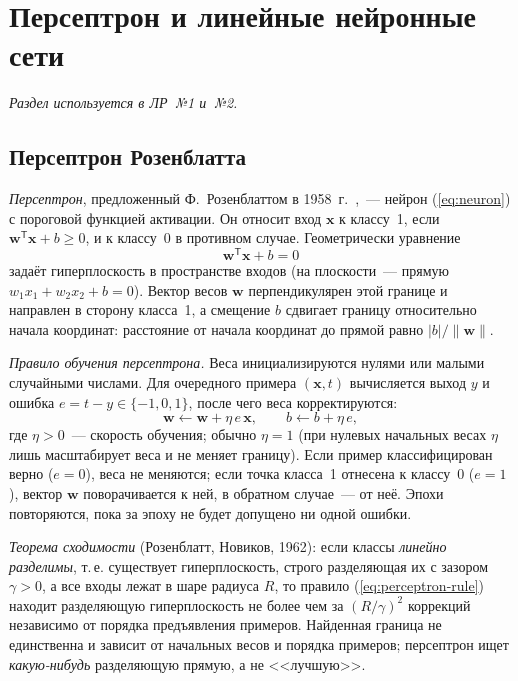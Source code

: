 \section{Персептрон и линейные нейронные сети}
\label{sec:perceptron}

\noindent\hspace{1.25cm}\emph{Раздел используется в ЛР~№1 и~№2.}

\subsection{Персептрон Розенблатта}

\emph{Персептрон}, предложенный Ф.~Розенблаттом в 1958~г.~\cite{rosenblatt1958},~--- нейрон
(\ref{eq:neuron}) с пороговой функцией активации. Он относит вход $\mathbf{x}$ к классу~1,
если $\mathbf{w}^{\mathsf T}\mathbf{x} + b \ge 0$, и к классу~0 в противном случае. Геометрически
уравнение
\begin{equation}
\label{eq:hyperplane}
\mathbf{w}^{\mathsf T}\mathbf{x} + b = 0
\end{equation}
задаёт гиперплоскость в пространстве входов (на плоскости~--- прямую $w_1x_1 + w_2x_2 + b = 0$). Вектор
весов $\mathbf{w}$ перпендикулярен этой границе и направлен в сторону класса~1, а смещение $b$ сдвигает
границу относительно начала координат: расстояние от начала координат до прямой равно
$|b| / \lVert\mathbf{w}\rVert$.

\emph{Правило обучения персептрона.} Веса инициализируются нулями или малыми случайными числами. Для
очередного примера $(\mathbf{x}, t)$ вычисляется выход $y$ и ошибка $e = t - y \in \{-1, 0, 1\}$, после
чего веса корректируются:
\begin{equation}
\label{eq:perceptron-rule}
\mathbf{w} \leftarrow \mathbf{w} + \eta\, e\, \mathbf{x}, \qquad b \leftarrow b + \eta\, e ,
\end{equation}
где $\eta > 0$~--- скорость обучения; обычно $\eta = 1$ (при нулевых начальных весах $\eta$ лишь
масштабирует веса и не меняет границу). Если пример
классифицирован верно ($e = 0$), веса не меняются; если точка класса~1 отнесена к классу~0 ($e = 1$),
вектор $\mathbf{w}$ поворачивается к ней, в обратном случае~--- от неё. Эпохи повторяются, пока за
эпоху не будет допущено ни одной ошибки.

\emph{Теорема сходимости} (Розенблатт, Новиков, 1962): если классы \emph{линейно разделимы}, т.\,е.
существует гиперплоскость, строго разделяющая их с зазором $\gamma > 0$, а все входы лежат в шаре
радиуса $R$, то правило (\ref{eq:perceptron-rule}) находит разделяющую гиперплоскость не более чем за
$(R/\gamma)^2$ коррекций независимо от порядка предъявления примеров. Найденная граница не единственна
и зависит от начальных весов и порядка примеров; персептрон ищет \emph{какую-нибудь} разделяющую
прямую, а не <<лучшую>>.

